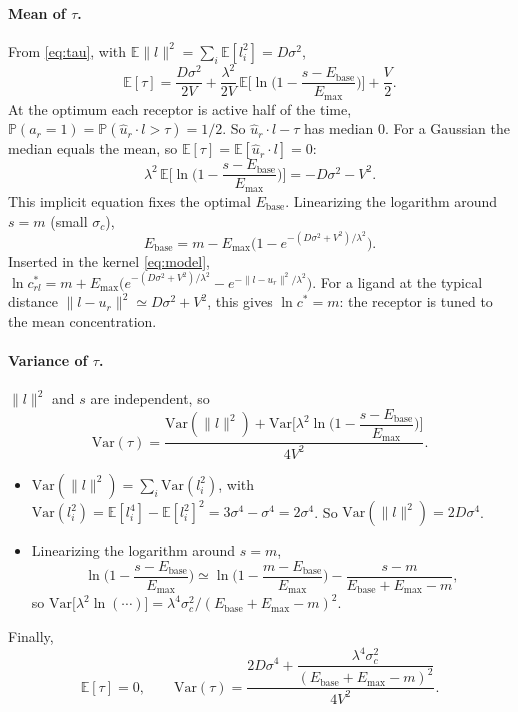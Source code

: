 \documentclass[11pt,a4paper]{article}
\newcommand{\EE}{\mathbb{E}}
\newcommand{\PP}{\mathbb{P}}
\newcommand{\Var}{\mathrm{Var}}
\newcommand{\Ebase}{E_{\mathrm{base}}}
\newcommand{\Emax}{E_{\mathrm{max}}}
\newcommand{\uhat}{\hat{u}}
\begin{document}
\paragraph{Mean of $\tau$.} From \eqref{eq:tau}, with $\EE\|l\|^2=\sum_i\EE[l_i^2]=D\sigma^2$,
\begin{equation}
  \EE[\tau]=\frac{D\sigma^2}{2V}
  +\frac{\lambda^2}{2V}\,\EE\Big[\ln\Big(1-\frac{s-\Ebase}{\Emax}\Big)\Big]
  +\frac V2 .
\end{equation}
At the optimum each receptor is active half of the time,
$\PP(a_r=1)=\PP(\uhat_r\cdot l>\tau)=1/2$. So $\uhat_r\cdot l-\tau$ has median $0$. For a
Gaussian the median equals the mean, so $\EE[\tau]=\EE[\uhat_r\cdot l]=0$:
\begin{equation}
  \boxed{\;\lambda^2\,\EE\Big[\ln\Big(1-\frac{s-\Ebase}{\Emax}\Big)\Big]=-D\sigma^2-V^2.\;}
  \label{eq:balance}
\end{equation}
This implicit equation fixes the optimal $\Ebase$. Linearizing the logarithm around $s=m$
(small $\sigma_c$),
\begin{equation}
  \Ebase=m-\Emax\Big(1-e^{-(D\sigma^2+V^2)/\lambda^2}\Big).
  \label{eq:Ebase}
\end{equation}
Inserted in the kernel \eqref{eq:model},
$\ln c^*_{rl}=m+\Emax\big(e^{-(D\sigma^2+V^2)/\lambda^2}-e^{-\|l-u_r\|^2/\lambda^2}\big)$.
For a ligand at the typical distance $\|l-u_r\|^2\simeq D\sigma^2+V^2$, this gives
$\ln c^*=m$: the receptor is tuned to the mean concentration.

\paragraph{Variance of $\tau$.} $\|l\|^2$ and $s$ are independent, so
\begin{equation}
  \Var(\tau)=\frac{\Var(\|l\|^2)
  +\Var\Big[\lambda^2\ln\Big(1-\dfrac{s-\Ebase}{\Emax}\Big)\Big]}{4V^2}.
\end{equation}
\begin{itemize}
\item $\Var(\|l\|^2)=\sum_i\Var(l_i^2)$, with
  $\Var(l_i^2)=\EE[l_i^4]-\EE[l_i^2]^2=3\sigma^4-\sigma^4=2\sigma^4$.
  So $\Var(\|l\|^2)=2D\sigma^4$.
\item Linearizing the logarithm around $s=m$,
  \begin{equation*}
    \ln\Big(1-\frac{s-\Ebase}{\Emax}\Big)
    \simeq\ln\Big(1-\frac{m-\Ebase}{\Emax}\Big)-\frac{s-m}{\Ebase+\Emax-m},
  \end{equation*}
  so $\Var\big[\lambda^2\ln(\cdots)\big]=\lambda^4\sigma_c^2/(\Ebase+\Emax-m)^2$.
\end{itemize}
Finally,
\begin{equation}
  \boxed{\;\EE[\tau]=0,
  \qquad
  \Var(\tau)=\frac{2D\sigma^4+\dfrac{\lambda^4\sigma_c^2}{(\Ebase+\Emax-m)^2}}{4V^2}.\;}
  \label{eq:vartau}
\end{equation}
\end{document}

